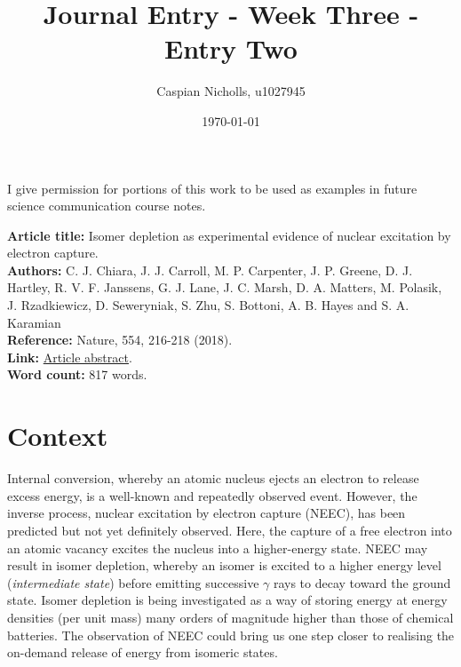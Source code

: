 \documentclass[12pt,a4paper]{article}
\begin{document}
\title{Journal Entry - Week Three - Entry Two}
\author{Caspian Nicholls, u1027945}
\date{\today}

\maketitle

\noindent
I give permission for portions of this work to be used as examples in future science communication course notes.

\medskip
\noindent
\textbf{Article title:} Isomer depletion as experimental evidence of
nuclear excitation by electron capture. \\
\textbf{Authors:} C. J. Chiara, J. J. Carroll, M. P. Carpenter, J. P. Greene, D. J. Hartley, R. V. F. Janssens, G. J. Lane, J. C. Marsh, D. A. Matters, M. Polasik, J. Rzadkiewicz, D. Seweryniak, S. Zhu, S. Bottoni, A. B. Hayes and S. A. Karamian\\
\textbf{Reference:} Nature, 554, 216-218 (2018). \\
\textbf{Link:}  \href{https://www.nature.com/articles/nature25483}{Article abstract}. \\
\textbf{Word count:} 817 words.

\section*{Context}

Internal conversion, whereby an atomic nucleus ejects an electron to release excess energy, is a well-known and repeatedly observed event. However, the inverse process, nuclear excitation by electron capture (NEEC), has been predicted but not yet definitely observed. Here, the capture of a free electron into an atomic vacancy excites the nucleus into a higher-energy state. NEEC may result in isomer depletion, whereby an isomer is excited to a higher energy level (\textit{intermediate state}) before emitting successive $\gamma$ rays to decay toward the ground state. Isomer depletion is being investigated as a way of storing energy at energy densities (per unit mass) many orders of magnitude higher than those of chemical batteries. The observation of NEEC could bring us one step closer to realising the on-demand release of energy from isomeric states.
\end{document}

